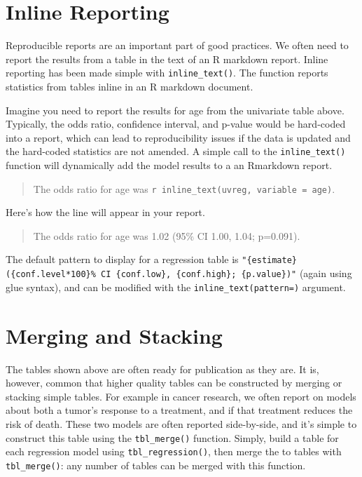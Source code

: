 \section{Inline Reporting}

Reproducible reports are an important part of good practices.
We often need to report the results from a table in the text of an R markdown report.
Inline reporting has been made simple with \texttt{inline\_text()}.
The function reports statistics from  tables inline in an R markdown document.

Imagine you need to report the results for age from the univariate table above.
Typically, the odds ratio, confidence interval, and p-value would be hard-coded into a report, which can lead to reproducibility issues if the data is updated and the hard-coded statistics are not amended.
A simple call to the \texttt{inline\_text()} function will dynamically add the model results to a an Rmarkdown report.

\begin{quote}
The odds ratio for age was \texttt{\textasciigrave{}r\ inline\_text(uvreg,\ variable\ =\ age)\textasciigrave{}}.
\end{quote}

Here's how the line will appear in your report.

\begin{quote}
The odds ratio for age was 1.02 (95\% CI 1.00, 1.04; p=0.091).
\end{quote}

The default pattern to display for a regression table is \texttt{"\{estimate\} (\{conf.level*100\}\% CI \{conf.low\}, \{conf.high\}; \{p.value\})"} (again using glue syntax), and can be modified with the \texttt{inline\_text(pattern=)} argument. 

\section{Merging and Stacking}

The  tables shown above are often ready for publication as they are.
It is, however, common that higher quality tables can be constructed by merging or stacking simple tables.
For example in cancer research, we often report on models about both a tumor's response to a treatment, and if that treatment reduces the risk of death.
These two models are often reported side-by-side, and it's simple to construct this table using  the \texttt{tbl\_merge()} function.
Simply, build a table for each regression model using \texttt{tbl\_regression()}, then merge the to tables with \texttt{tbl\_merge()}: any number of  tables can be merged with this function.

